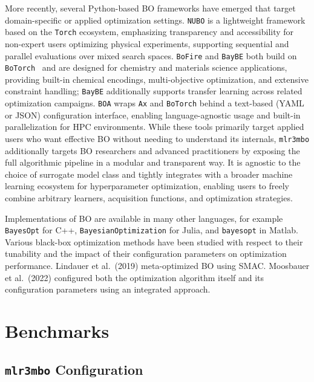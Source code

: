 \documentclass[12pt,letterpaper]{article}
\begin{document}
More recently, several Python-based BO frameworks have emerged that target domain-specific or applied optimization settings.
\texttt{NUBO}\cite{diessner2025} is a lightweight framework based on the \texttt{Torch} ecosystem, emphasizing transparency and accessibility for non-expert users optimizing physical experiments, supporting sequential and parallel evaluations over mixed search spaces.
\texttt{BoFire}\cite{durholt2024} and \texttt{BayBE}\cite{fitzner2025} both build on \texttt{BoTorch}~\cite{balandat2020} and are designed for chemistry and materials science applications, providing built-in chemical encodings, multi-objective optimization, and extensive constraint handling; \texttt{BayBE} additionally supports transfer learning across related optimization campaigns.
\texttt{BOA}\cite{scyphers2024} wraps \texttt{Ax} and \texttt{BoTorch} behind a text-based (YAML or JSON) configuration interface, enabling language-agnostic usage and built-in parallelization for HPC environments.
While these tools primarily target applied users who want effective BO without needing to understand its internals, \texttt{mlr3mbo} additionally targets BO researchers and advanced practitioners by exposing the full algorithmic pipeline in a modular and transparent way.
It is agnostic to the choice of surrogate model class and tightly integrates with a broader machine learning ecosystem for hyperparameter optimization, enabling users to freely combine arbitrary learners, acquisition functions, and optimization strategies.

Implementations of BO are available in many other languages, for example \texttt{BayesOpt}\cite{martinez-cantin2014} for C++, \texttt{BayesianOptimization} for Julia, and \texttt{bayesopt} in Matlab.
Various black-box optimization methods have been studied with respect to their tunability and the impact of their configuration parameters on optimization performance.
Lindauer et al.\ (2019)\cite{lindauer2019} meta-optimized BO using SMAC.
Moosbauer et al.\ (2022)\cite{moosbauer2022} configured both the optimization algorithm itself and its configuration parameters using an integrated approach. 

\section{Benchmarks}
\label{sec:benchmarks}

\subsection*{\texttt{mlr3mbo} Configuration}
\label{sec:mlr3mbo-configuration}
\end{document}
